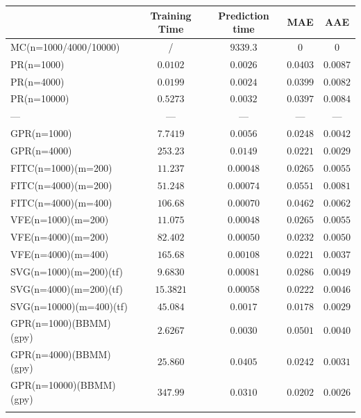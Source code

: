 \documentclass[12pt,a4paper,oneside]{book}
\begin{document}
\begin{table}\centering 
\begin{tabular}[t]{lcccc}\toprule
            &   Training Time  &  Prediction time &  MAE & AAE   \\ \midrule
MC(n=1000/4000/10000)    &/ & $9339.3$ &  $0$  &  $0$    \\\addlinespace
PR(n=1000)   & $0.0102$ &  $0.0026$   & $0.0403$ &   $0.0087$   \\\addlinespace
PR(n=4000)   & $0.0199$ &  $0.0024$   & $0.0399$ & $0.0082$     \\\addlinespace
PR(n=10000)	  & $0.5273$ & $0.0032$    & $0.0397$ &  $0.0084$     \\\addlinespace
\qquad \qquad \qquad \qquad \qquad ---	  &   --- & --- & --- & ---     \\\addlinespace
GPR(n=1000)   & $7.7419$ &  $0.0056$   & $0.0248$ &  $0.0042$   \\\addlinespace
GPR(n=4000)   & $253.23$  &  $0.0149$   & $0.0221$  &  $0.0029$    \\\addlinespace
FITC(n=1000)(m=200)  & $11.237$ & $0.00048$    & $0.0265$ & $0.0055$  \\\addlinespace
FITC(n=4000)(m=200)   & $51.248$ & $0.00074$    & $0.0551$ &  $0.0081$   \\\addlinespace
FITC(n=4000)(m=400)	 & $106.68$ &  $0.00070$   & $0.0462$  &  $0.0062$   \\\addlinespace
VFE(n=1000)(m=200)  & $11.075$ & $0.00048$    & $0.0265$ & $0.0055$  \\\addlinespace
VFE(n=4000)(m=200)   & $82.402$  & $0.00050$    & $0.0232$ &  $0.0050$   \\\addlinespace
VFE(n=4000)(m=400)	 & $165.68$  & $0.00108$    & $0.0221$ & $0.0037$    \\\addlinespace
SVG(n=1000)(m=200)(tf)  & $9.6830$ & $0.00081$    & $0.0286$ & $0.0049$  \\\addlinespace
SVG(n=4000)(m=200)(tf)  & $15.3821$ & $0.00058$   & $0.0222$ & $0.0046$  \\\addlinespace
SVG(n=10000)(m=400)(tf)	  & $45.084$  & $0.0017$    & $0.0178$ & $0.0029$  \\\addlinespace
GPR(n=1000)(BBMM)(gpy)  & $2.6267$  & $0.0030$    & $0.0501$ &  $0.0040$     \\\addlinespace
GPR(n=4000)(BBMM)(gpy)  & $25.860$  & $0.0405$    & $0.0242$ & $0.0031$  \\\addlinespace
GPR(n=10000)(BBMM)(gpy)  & $347.99$ & $0.0310$    & $0.0202$ & $0.0026$  \\\addlinespace

\end{tabular}
\end{table}
\end{document}
